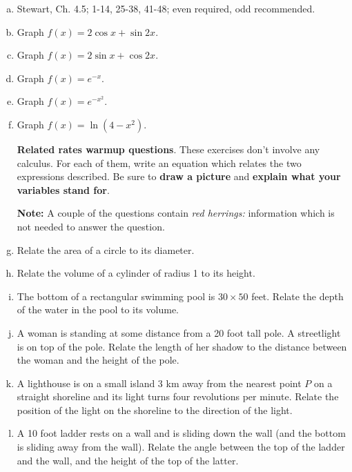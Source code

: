 \documentclass[12pt]{article}
\begin{document}
\begin{enumerate}[(a)]
\item

Stewart, Ch. 4.5; 1-14, 25-38, 41-48; even required, odd recommended.

\item
Graph $f(x) = 2 \cos x + \sin 2x$.

\item
Graph $f(x) = 2 \sin x + \cos 2x$.

\item
Graph $f(x) = e^{-x}$.

\item
Graph $f(x) = e^{-x^2}$.

\item
Graph $f(x) = \ln(4 - x^2)$.

{\bf Related rates warmup questions}. These exercises don't involve any calculus. For each of
them, write an equation which relates the two expressions described. Be sure to {\bf draw a picture}
and {\bf explain what your variables stand for}.

{\bf Note:} A couple of the questions contain {\itshape red herrings:} information which
is not needed to answer the question.

\item
Relate the area of a circle to its diameter.

\item
Relate the volume of a cylinder of radius 1 to its height.

\item
The bottom of a rectangular swimming pool is $30 \times 50$ feet. Relate
the depth of the water in the pool to its volume.

\item
A woman is standing at some distance from a 20 foot tall pole. A streetlight
is on top of the pole. Relate the length of her shadow to the distance between
the woman and the height of the pole.

\item
A lighthouse is on a small island 3 km away from the nearest point $P$ on 
a straight shoreline and its
light turns four revolutions per minute. Relate the position of the light
on the shoreline to the direction of the light.

\item
A 10 foot ladder rests on a wall and is sliding down the wall (and the bottom is sliding away from the wall). 
Relate the angle between the top of
the ladder and the wall, and the height of the top of the latter.


\end{enumerate}
\end{document}
